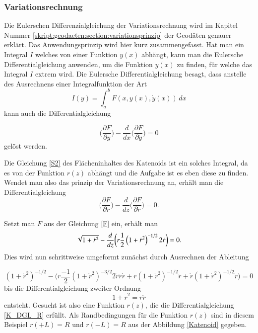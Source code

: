\begin{refsection}
\subsubsection{Variationsrechnung}
Die Eulerschen Differenzialgleichung der Variationsrechnung wird im Kapitel Nummer  \ref{skript:geodaeten:section:variationsprinzip}  der Geodäten genauer erklärt.
Das Anwendungsprinzip wird hier kurz zusammengefasst. Hat man ein Integral $I$ welches von einer Funktion $y(x)$ abhängt, kann man die Eulersche Differentialgleichung anwenden, um die Funktion $y(x)$ zu finden, für welche das Integral $I$ extrem wird. Die Eulersche Differentialgleichung besagt, dass anstelle des Ausrechnens  einer Integralfunktion der Art \begin{equation} \label{E_DGL1}  
  I(y)= \int_a^b F(x,y(x),\dot y(x))\,dx       
\end{equation}
kann auch die Differentialgleichung  



\begin{equation} \label{E_DGL2}
\bigg(\frac{\partial F}{\partial y}\bigg)- \frac{d}{dx} \bigg(\frac{\partial F}{\partial \dot{y}}\bigg)=0         
\end{equation}
gelöst werden.

Die Gleichung \eqref{S2} des Flächeninhaltes des Katenoids ist ein solches Integral, da es von der Funktion $r(z)$ abhängt und die Aufgabe ist es eben diese zu finden. Wendet man also das prinzip der Variationsrechnung an, erhält man die Differentialgleichung
\begin{equation} \label{K_DGL1}
\bigg(\frac{\partial F}{\partial r}\bigg)- \frac{d}{dz} \bigg(\frac{\partial F}{\partial \dot{r}}\bigg)=0 .
\end{equation}

Setzt man $F$ aus der Gleichung \eqref{F} ein, erhält man
\begin{equation} \label{K_DGL_H}
\sqrt{1+{\dot {r}}^2}-\frac{ d }{ dz } \bigg( r \frac{ 1 }{2  }\left( {1+{\dot {r}}^2}  \right)^{-1/2} 2 \dot {r}\bigg)=0 .
\\
\end{equation}
Dies wird nun schrittweise umgeformt zunächst durch Ausrechnen der Ableitung

\begin{equation} \label{K_DGL_H2}
\left(1+{\dot {r}}^2  \right)^{-1/2}-\bigg(r \frac{ -1 }{2  } \left({1+{\dot {r}}^2}  \right)^{-3/2} 2 \dot{r} \ddot{r}  \dot{r}+ r \left({1+{\dot {r}}^2}  \right)^{-1/2} \ddot{r} +\dot{r} \left({1+{\dot {r}}^2}  \right)^{-1/2} \dot{r}\bigg)=0
\end{equation}
bis die Differentialgleichung zweiter Ordnung  
\begin{equation} \label{K_DGL_R}
1+{\dot {r}}^2=r  \ddot{r}
\end{equation}
entsteht. 
Gesucht ist also eine Funktion $r(z)$, die die Differentialgleichung \eqref{K_DGL_R} erfüllt. Als Randbedingungen für die Funktion $r(z)$ sind in diesem Beispiel $r(+L)=R$ und $r(-L)=R$ aus der Abbildung \ref{Katenoid} gegeben.


\end{refsection}
